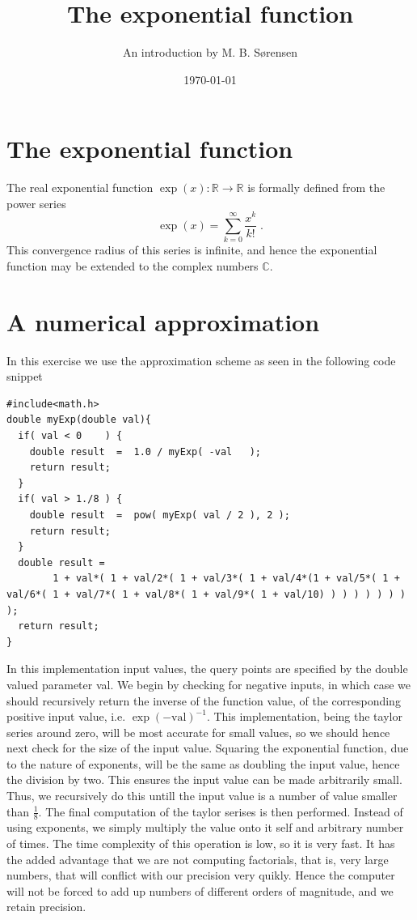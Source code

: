 \documentclass[twocolumn]{article}
\title{\textbf{The exponential function}}
\author{An introduction by M. B. Sørensen}
\date{\today}
\begin{document}
\maketitle

\section{The exponential function}
The real exponential function $\exp(x): \mathbb{R}\rightarrow\mathbb{R}$ is formally defined from the power series
\begin{equation}\label{eq:power}
	\exp(x) = \sum_{k=0}^\infty \frac{x^k}{k!} \;.
\end{equation}
This convergence radius of this series is infinite, and hence the exponential function may be extended to the complex numbers $\mathbb{C}$.

\section{A numerical approximation}
In this exercise we use the approximation scheme as seen in the following code snippet

\begin{lstlisting}
#include<math.h>
double myExp(double val){
  if( val < 0    ) {
    double result  =  1.0 / myExp( -val   );
    return result;
  }
  if( val > 1./8 ) {
    double result  =  pow( myExp( val / 2 ), 2 );
    return result;
  }
  double result =
		1 + val*( 1 + val/2*( 1 + val/3*( 1 + val/4*(1 + val/5*( 1 + val/6*( 1 + val/7*( 1 + val/8*( 1 + val/9*( 1 + val/10) ) ) ) ) ) ) ) );
  return result;
}

\end{lstlisting}
In this implementation input values, the query points are specified by the double valued parameter val.
We begin by checking for negative inputs, in which case we should recursively return the inverse of the function value,
of the corresponding positive input value, i.e. $\exp \left( -\text{val} \right)^{-1}$. This implementation, being the taylor series around zero,
will be most accurate for small values, so we should hence next check for the size of the input value. Squaring the exponential function, due to the
nature of exponents, will be the same as doubling the input value, hence the division by two. This ensures the input value can be made arbitrarily
small. Thus, we recursively do this untill the input value is a number of value smaller than $\frac18$. The final computation of the taylor serises
is then performed. Instead of using exponents, we simply multiply the value onto it self and arbitrary number of times. The time complexity of this
operation is low, so it is very fast. It has the added advantage that we are not computing factorials, that is, very large numbers, that will conflict
with our precision very quikly. Hence the computer will not be forced to add up numbers of different orders of magnitude, and we retain precision.
\end{document}
